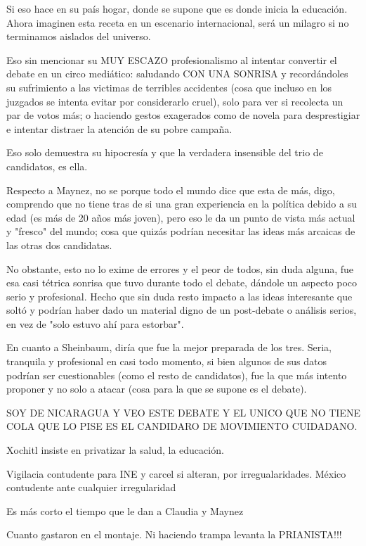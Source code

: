 Si eso hace en su país hogar, donde se supone que es donde inicia la educación. Ahora imaginen esta receta en un escenario internacional, será un milagro si no terminamos aislados del universo.

Eso sin mencionar su MUY ESCAZO profesionalismo al intentar convertir el debate en un circo mediático: saludando CON UNA SONRISA y recordándoles su sufrimiento a las victimas de terribles accidentes (cosa que incluso en los juzgados se intenta evitar por considerarlo cruel), solo para ver si recolecta un par de votos más; o haciendo gestos exagerados como de novela para desprestigiar e intentar distraer la atención de su pobre campaña.

Eso solo demuestra su hipocresía y que la verdadera insensible del trio de candidatos, es ella.

Respecto a Maynez, no se porque todo el mundo dice que esta de más, digo, comprendo que no tiene tras de si una gran experiencia en la política debido a su edad (es más de 20 años más joven), pero eso le da un punto de vista más actual y "fresco" del mundo; cosa que quizás podrían necesitar las ideas más arcaicas de las otras dos candidatas.

No obstante, esto no lo exime de errores y el peor de todos, sin duda alguna, fue esa casi tétrica sonrisa que tuvo durante todo el debate, dándole un aspecto poco serio y profesional. Hecho que sin duda resto impacto a las ideas interesante que soltó y podrían haber dado un material digno de un post-debate o análisis serios, en vez de "solo estuvo ahí para estorbar".

En cuanto a Sheinbaum, diría que fue la mejor preparada de los tres. Seria, tranquila y profesional en casi todo momento, si bien algunos de sus datos podrían ser cuestionables (como el resto de candidatos), fue la que más intento proponer y no solo a atacar (cosa para la que se supone es el debate).

SOY DE NICARAGUA Y VEO ESTE DEBATE Y EL UNICO QUE NO TIENE COLA QUE LO PISE ES EL CANDIDARO DE MOVIMIENTO CUIDADANO.

Xochitl insiste en privatizar la salud, la educación.

Vigilacia contudente para INE y carcel si alteran, por irregualaridades. México contudente ante cualquier irregularidad

Es más corto el tiempo que le dan a Claudia y Maynez

Cuanto gastaron en el montaje. Ni haciendo trampa levanta la PRIANISTA!!!

